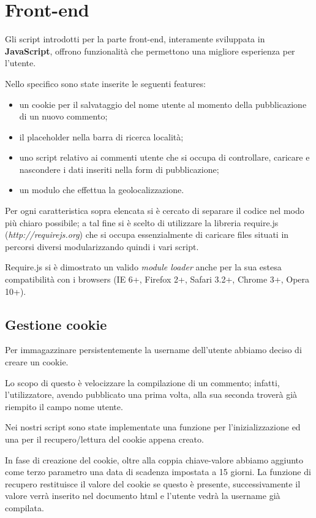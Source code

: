 \section{Front-end}
Gli script introdotti per la parte front-end, interamente sviluppata in
\textbf{JavaScript}, offrono funzionalità che permettono una migliore
esperienza per l'utente.


Nello specifico sono state inserite le seguenti features:
\begin {itemize}
\item un cookie per il salvataggio del nome utente al momento della
pubblicazione di un nuovo commento;
\item il placeholder nella barra di ricerca località;
\item uno script relativo ai commenti utente che si occupa di controllare,
caricare e nascondere i dati inseriti nella form di pubblicazione;
\item un modulo che effettua la geolocalizzazione.
\end {itemize} 
Per ogni caratteristica sopra elencata si è cercato di separare il codice nel
modo più chiaro possibile; a tal fine si è scelto di utilizzare la libreria
require.js (\textit{http://requirejs.org}) che si occupa essenzialmente di
caricare files situati in percorsi diversi modularizzando quindi i vari
script.


Require.js si è dimostrato un valido \textit{module loader} anche per la sua
estesa compatibilità con i browsers (IE 6+, Firefox 2+, Safari 3.2+, Chrome
3+, Opera 10+).

\subsection{Gestione cookie}
Per immagazzinare persistentemente la username dell'utente abbiamo deciso di
creare un cookie.

Lo scopo di questo è velocizzare la compilazione di un commento; infatti,
l'utilizzatore, avendo pubblicato una prima volta, alla sua seconda troverà
già riempito il campo nome utente.

Nei nostri script sono state implementate una funzione per l'inizializzazione
ed una per il recupero/lettura del cookie appena creato.


In fase di creazione del cookie, oltre alla coppia chiave-valore abbiamo aggiunto come terzo parametro una data di scadenza impostata a 15 giorni.
La funzione di recupero restituisce il valore del cookie se questo è presente, successivamente il valore verrà inserito nel documento html e l'utente vedrà la username già compilata.

